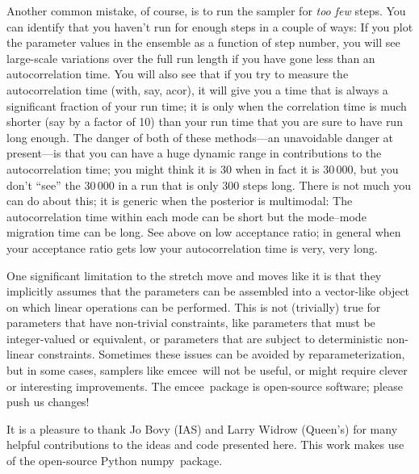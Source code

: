\documentclass[12pt,preprint]{aastex}
\newcommand{\project}[1]{{\sffamily #1}}
\newcommand{\numpy}{\project{numpy}}
\newcommand{\acor}{\project{acor}}
\newcommand{\thisplain}{emcee}
\newcommand{\this}{\project{\thisplain}}
\begin{document}
Another common mistake, of course, is to run the sampler for \emph{too
  few} steps.  You can identify that you haven't run for enough steps
in a couple of ways: If you plot the parameter values in the ensemble
as a function of step number, you will see large-scale variations over
the full run length if you have gone less than an autocorrelation
time.  You will also see that if you try to measure the
autocorrelation time (with, say, \acor), it will give you a time that
is always a significant fraction of your run time; it is only when the
correlation time is much shorter (say by a factor of 10) than your run
time that you are sure to have run long enough.  The danger of both of
these methods---an unavoidable danger at present---is that you can
have a huge dynamic range in contributions to the autocorrelation
time; you might think it is 30 when in fact it is 30\,000, but you
don't ``see'' the 30\,000 in a run that is only 300 steps long.  There
is not much you can do about this; it is generic when the posterior is
multimodal: The autocorrelation time within each mode can be short but
the mode--mode migration time can be long.  See above on low
acceptance ratio; in general when your acceptance ratio gets low your
autocorrelation time is very, very long.

One significant limitation to the stretch move and moves like it is
that they implicitly assumes that the parameters can be assembled into
a vector-like object on which linear operations can be performed.
This is not (trivially) true for parameters that have non-trivial
constraints, like parameters that must be integer-valued or
equivalent, or parameters that are subject to deterministic non-linear
constraints.  Sometimes these issues can be avoided by
reparameterization, but in some cases, samplers like \this\ will not
be useful, or might require clever or interesting improvements.  The
\this\ package is open-source software; please push us changes!

\acknowledgments It is a pleasure to thank Jo Bovy (IAS) and Larry
Widrow (Queen's) for many helpful contributions to the ideas and code
presented here.  This work makes use of the open-source Python
\numpy\ package.
\end{document}
